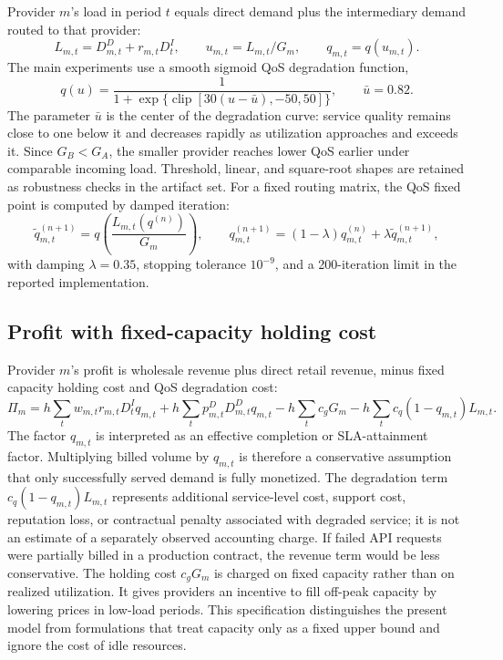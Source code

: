 \documentclass[11pt,a4paper]{article}
\newcommand{\qos}{q}
\newcommand{\D}{D}
\begin{document}
Provider $m$'s load in period $t$ equals direct demand plus the intermediary demand routed to that provider:
\begin{equation}
  L_{m,t}=\D^D_{m,t}+r_{m,t}\D^I_t,
  \qquad
  u_{m,t}=L_{m,t}/G_m,
  \qquad
  q_{m,t}=\qos(u_{m,t}).
  \label{eq:load}
\end{equation}
The main experiments use a smooth sigmoid QoS degradation function,
\begin{equation}
  \qos(u)=
  \frac{1}{1+\exp\{\operatorname{clip}[30(u-\bar u),-50,50]\}},
  \qquad \bar u=0.82 .
  \label{eq:qos_function}
\end{equation}
The parameter $\bar u$ is the center of the degradation curve: service quality remains close to one below it and decreases rapidly as utilization approaches and exceeds it. Since $G_B<G_A$, the smaller provider reaches lower QoS earlier under comparable incoming load. Threshold, linear, and square-root shapes are retained as robustness checks in the artifact set. For a fixed routing matrix, the QoS fixed point is computed by damped iteration:
\begin{equation}
  \tilde q^{(n+1)}_{m,t}
  =\qos\!\left(\frac{L_{m,t}(q^{(n)})}{G_m}\right),
  \qquad
  q^{(n+1)}_{m,t}
  =(1-\lambda)q^{(n)}_{m,t}+\lambda \tilde q^{(n+1)}_{m,t},
  \label{eq:qos_fixed_point}
\end{equation}
with damping $\lambda=0.35$, stopping tolerance $10^{-9}$, and a 200-iteration limit in the reported implementation.

\subsection{Profit with fixed-capacity holding cost}

Provider $m$'s profit is wholesale revenue plus direct retail revenue, minus fixed capacity holding cost and QoS degradation cost:
\begin{equation}
  \Pi_m=h\!\sum_t\! w_{m,t}r_{m,t}\D^I_t q_{m,t}
  +h\!\sum_t\! p^D_{m,t}\D^D_{m,t}q_{m,t}
  -h\!\sum_t\! c_g G_m
  -h\!\sum_t\! c_q(1-q_{m,t})L_{m,t}.
  \label{eq:firm_profit}
\end{equation}
The factor $q_{m,t}$ is interpreted as an effective completion or SLA-attainment factor. Multiplying billed volume by $q_{m,t}$ is therefore a conservative assumption that only successfully served demand is fully monetized. The degradation term $c_q(1-q_{m,t})L_{m,t}$ represents additional service-level cost, support cost, reputation loss, or contractual penalty associated with degraded service; it is not an estimate of a separately observed accounting charge. If failed API requests were partially billed in a production contract, the revenue term would be less conservative. The holding cost $c_gG_m$ is charged on fixed capacity rather than on realized utilization. It gives providers an incentive to fill off-peak capacity by lowering prices in low-load periods. This specification distinguishes the present model from formulations that treat capacity only as a fixed upper bound and ignore the cost of idle resources.
\end{document}
